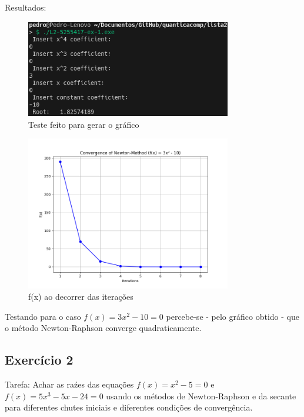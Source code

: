 \documentclass[12pt, a4paper]{article} %
\begin{document}
        Resultados:
        \begin{figure}
            \centering
            \includegraphics[width=0.8\textwidth]{../images/results-ex-1.png}
            \caption{Teste feito para gerar o gr\'afico}
        \end{figure}

        \begin{figure}[H]
            \centering
            \includegraphics[width=0.8\textwidth]{../images/grafic-ex-1.png}
            \caption{f(x) ao decorrer das itera\c{c}\~oes}
        \end{figure}
       
        Testando para o caso $f(x) = 3x^2 - 10 = 0$ percebe-se - pelo gr\'afico obtido -  que o m\'etodo Newton-Raphson converge quadraticamente.

    \subsection{Exerc\'icio 2}

        Tarefa: Achar as ra\'zes das equa\c{c}\~oes $f(x) = x^2 - 5 = 0$ e $f(x) = 5x^3 - 5x - 24 = 0$ usando os m\'etodos de Newton-Raphson e da secante para diferentes chutes iniciais e diferentes condi\c{c}\~oes de converg\^encia.
\end{document}
